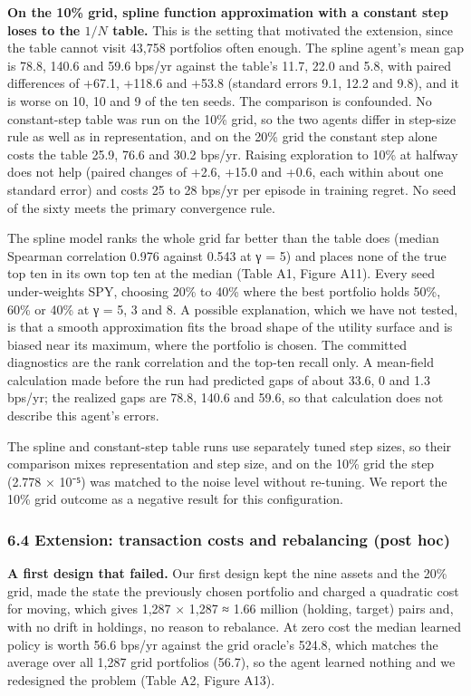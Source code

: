 \documentclass[
  11pt]{article}
\begin{document}
\textbf{On the 10\% grid, spline function approximation with a constant
step loses to the \(1/N\) table.} This is the setting that motivated the
extension, since the table cannot visit 43,758 portfolios often enough.
The spline agent's mean gap is 78.8, 140.6 and 59.6 bps/yr against the
table's 11.7, 22.0 and 5.8, with paired differences of +67.1, +118.6 and
+53.8 (standard errors 9.1, 12.2 and 9.8), and it is worse on 10, 10 and
9 of the ten seeds. The comparison is confounded. No constant-step table
was run on the 10\% grid, so the two agents differ in step-size rule as
well as in representation, and on the 20\% grid the constant step alone
costs the table 25.9, 76.6 and 30.2 bps/yr. Raising exploration to 10\%
at halfway does not help (paired changes of +2.6, +15.0 and +0.6, each
within about one standard error) and costs 25 to 28 bps/yr per episode
in training regret. No seed of the sixty meets the primary convergence
rule.

The spline model ranks the whole grid far better than the table does
(median Spearman correlation 0.976 against 0.543 at γ = 5) and places
none of the true top ten in its own top ten at the median (Table A1,
Figure A11). Every seed under-weights SPY, choosing 20\% to 40\% where
the best portfolio holds 50\%, 60\% or 40\% at γ = 5, 3 and 8. A
possible explanation, which we have not tested, is that a smooth
approximation fits the broad shape of the utility surface and is biased
near its maximum, where the portfolio is chosen. The committed
diagnostics are the rank correlation and the top-ten recall only. A
mean-field calculation made before the run had predicted gaps of about
33.6, 0 and 1.3 bps/yr; the realized gaps are 78.8, 140.6 and 59.6, so
that calculation does not describe this agent's errors.

The spline and constant-step table runs use separately tuned step sizes,
so their comparison mixes representation and step size, and on the 10\%
grid the step (2.778 × 10⁻⁵) was matched to the noise level without
re-tuning. We report the 10\% grid outcome as a negative result for this
configuration.

\subsubsection{6.4 Extension: transaction costs and rebalancing (post
hoc)}\label{extension-transaction-costs-and-rebalancing-post-hoc}

\textbf{A first design that failed.} Our first design kept the nine
assets and the 20\% grid, made the state the previously chosen portfolio
and charged a quadratic cost for moving, which gives 1,287 × 1,287 ≈
1.66 million (holding, target) pairs and, with no drift in holdings, no
reason to rebalance. At zero cost the median learned policy is worth
56.6 bps/yr against the grid oracle's 524.8, which matches the average
over all 1,287 grid portfolios (56.7), so the agent learned nothing and
we redesigned the problem (Table A2, Figure A13).
\end{document}
